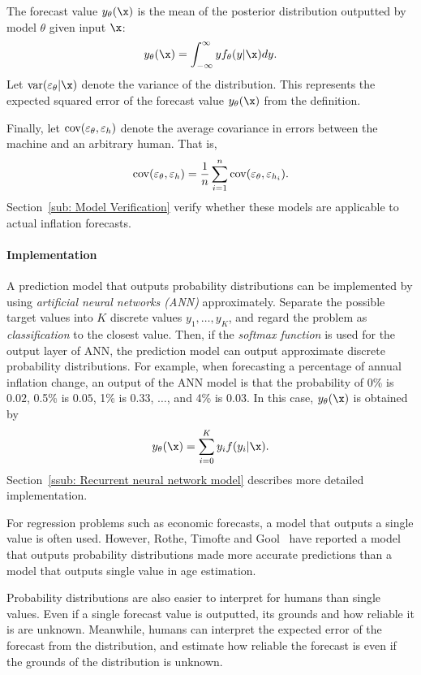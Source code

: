 \documentclass[../main.tex]{subfiles}
\begin{document}
The forecast value $y_\theta(\x)$ is the mean of the posterior distribution outputted by model $\theta$ given input $\x$:
\begin{equation}
  y_\theta(\x) = \int_{- \infty}^\infty yf_\theta(y|\x)dy.
\end{equation}
Let $\varm$ denote the variance of the distribution.
This represents the expected squared error of the forecast value $y_\theta(\x)$ from the definition.

Finally, let $\operatorname{cov}(\varepsilon_\theta, \varepsilon_h)$ denote the average covariance in errors between the machine and an arbitrary human.  That is,
\begin{equation}
  \operatorname{cov}(\varepsilon_\theta, \varepsilon_h) = \frac{1}{n}\sum_{i=1}^n\operatorname{cov}(\varepsilon_\theta, \varepsilon_{h_i}).
  \label{eq: covmh}
\end{equation}
Section~\ref{sub: Model Verification} verify whether these models are applicable to actual inflation forecasts.

\paragraph{Implementation}

A prediction model that outputs probability distributions can be implemented by using \emph{artificial neural networks (ANN)} approximately.
Separate the possible target values into $K$ discrete values $y_1,\dots,y_K$, and regard the problem as \emph{classification} to the closest value.
Then, if the \emph{softmax function} is used for the output layer of ANN, the prediction model can output approximate discrete probability distributions.
For example, when forecasting a percentage of annual inflation change, an output of the ANN model is that the probability of 0\% is $0.02$, 0.5\% is $0.05$, 1\% is $0.33$, $\dots$, and 4\% is $0.03$.
In this case, $y_\theta(\x)$ is obtained by
\begin{equation}
  y_\theta(\x) = \sum_{i=0}^K y_i f(y_i|\x).
\end{equation}
Section~\ref{ssub: Recurrent neural network model} describes more detailed implementation.

For regression problems such as economic forecasts, a model that outputs a single value is often used.
However, Rothe, Timofte and Gool~\cite{Rothe2016} have reported a model that outputs probability distributions made more accurate predictions than a model that outputs single value in age estimation.

Probability distributions are also easier to interpret for humans than single values.
Even if a single forecast value is outputted, its grounds and how reliable it is are unknown.
Meanwhile, humans can interpret the expected error of the forecast from the distribution, and estimate how reliable the forecast is even if the grounds of the distribution is unknown.
\end{document}
